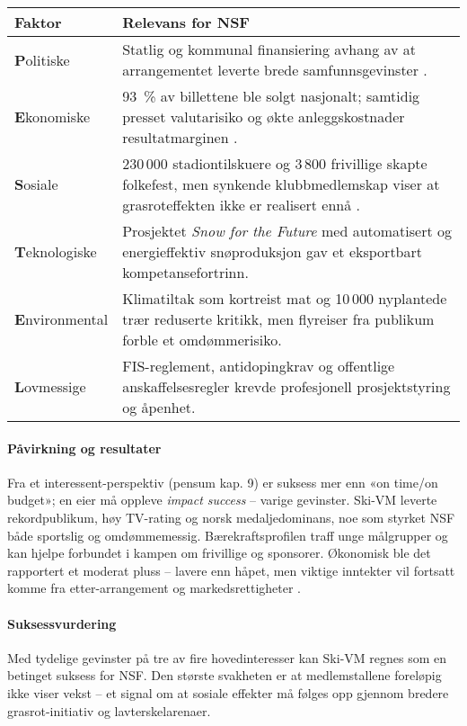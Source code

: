 \begin{table}[H]
    \centering
    \begin{tabular}{@{}p{2.7cm}p{10.2cm}@{}}
    \toprule
    \textbf{Faktor}  & \textbf{Relevans for NSF} \\ \midrule
    \textbf{P}olitiske   & Statlig og kommunal finansiering avhang av at arrangementet leverte brede samfunnsgevinster \cite{TrondheimKommune}. \\
    \textbf{E}konomiske  & 93~\% av billettene ble solgt nasjonalt; samtidig presset valutarisiko og økte anleggskostnader resultatmarginen \cite{AdressaKjopefest}.            \\
    \textbf{S}osiale     & 230\,000 stadiontilskuere og 3\,800 frivillige skapte folkefest, men synkende klubbmedlemskap viser at grasroteffekten ikke er realisert ennå \cite{Adresseavisen,OsloVM}. \\
    \textbf{T}eknologiske& Prosjektet \textit{Snow for the Future} med automatisert og energieffektiv snøproduksjon gav et eksportbart kompetansefortrinn\cite{Trondheim2025Sustainability}. \\
    \textbf{E}nvironmental & Klimatiltak som kortreist mat og 10\,000 nyplantede trær reduserte kritikk, men flyreiser fra publikum forble et omdømmerisiko.           \\
    \textbf{L}ovmessige  & FIS-reglement, antidopingkrav og offentlige anskaffelsesregler krevde profesjonell prosjektstyring og åpenhet.                               \\ \bottomrule
    \end{tabular}
\end{table}

\paragraph{Påvirkning og resultater}
Fra et interessent-perspektiv (pensum kap. 9) er suksess mer enn «on time/on budget»; en eier må oppleve \textit{impact success} -- varige gevinster. Ski-VM leverte rekordpublikum, høy TV-rating og norsk medaljedominans, noe som styrket NSF både sportslig og omdømmemessig.
Bærekraftsprofilen traff unge målgrupper og kan hjelpe forbundet i kampen om frivillige og sponsorer.
Økonomisk ble det rapportert et moderat pluss -- lavere enn håpet, men viktige inntekter vil fortsatt komme fra etter-arrangement og markedsrettigheter \cite{Trondheim2025Portal,Adresseavisen}.

\paragraph{Suksessvurdering}
Med tydelige gevinster på tre av fire hovedinteresser kan Ski-VM regnes som en betinget suksess for NSF. Den største svakheten er at medlemstallene foreløpig ikke viser vekst -- et signal om at sosiale effekter må følges opp gjennom bredere grasrot-initiativ og lavterskelarenaer.

